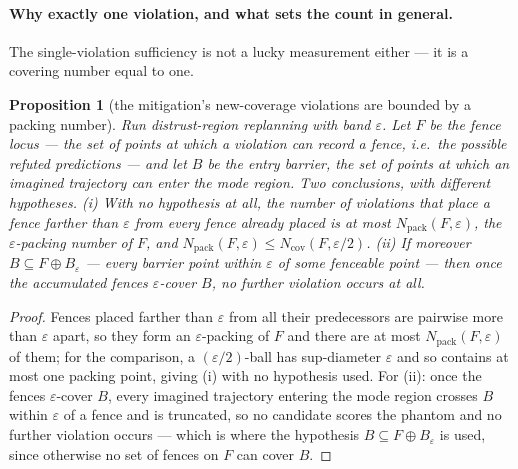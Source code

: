 \documentclass[11pt]{article}
\newtheorem{proposition}{Proposition}
\theoremstyle{definition}
\theoremstyle{remark}
\begin{document}
\paragraph{Why exactly one violation, and what sets the count in general.} The single-violation sufficiency is not a lucky measurement either --- it is a covering number equal to one.

\begin{proposition}[the mitigation's new-coverage violations are bounded by a packing number]
\label{prop:fencecover}
Run distrust-region replanning with band $\varepsilon$. Let $F$ be the \emph{fence locus} --- the set of points at which a violation can record a fence, i.e.\ the possible refuted predictions --- and let $B$ be the \emph{entry barrier}, the set of points at which an imagined trajectory can enter the mode region. Two conclusions, with different hypotheses. (i) With no hypothesis at all, the number of violations that place a fence farther than $\varepsilon$ from every fence already placed is at most $N_{\mathrm{pack}}(F,\varepsilon)$, the $\varepsilon$-packing number of $F$, and $N_{\mathrm{pack}}(F,\varepsilon) \leq N_{\mathrm{cov}}(F,\varepsilon/2)$. (ii) If moreover $B \subseteq F \oplus B_\varepsilon$ --- every barrier point within $\varepsilon$ of some fenceable point --- then once the accumulated fences $\varepsilon$-cover $B$, no further violation occurs at all.
\end{proposition}

\begin{proof}
Fences placed farther than $\varepsilon$ from all their predecessors are pairwise more than $\varepsilon$ apart, so they form an $\varepsilon$-packing of $F$ and there are at most $N_{\mathrm{pack}}(F,\varepsilon)$ of them; for the comparison, a $(\varepsilon/2)$-ball has sup-diameter $\varepsilon$ and so contains at most one packing point, giving (i) with no hypothesis used. For (ii): once the fences $\varepsilon$-cover $B$, every imagined trajectory entering the mode region crosses $B$ within $\varepsilon$ of a fence and is truncated, so no candidate scores the phantom and no further violation occurs --- which is where the hypothesis $B \subseteq F \oplus B_\varepsilon$ is used, since otherwise no set of fences on $F$ can cover $B$.
\end{proof}
\end{document}
